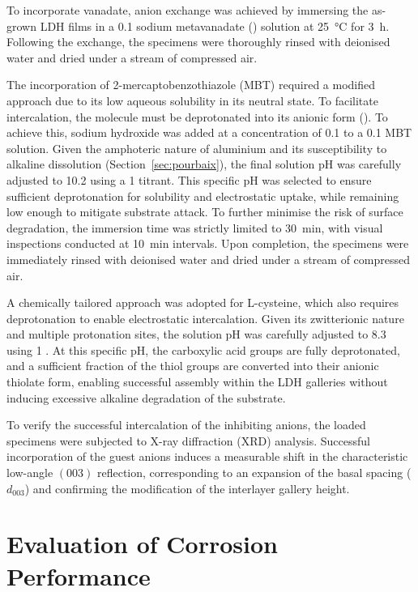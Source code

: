 \documentclass[11pt,twoside,a4paper,final]{report}
\begin{document}
To incorporate vanadate, anion exchange was achieved by immersing the as-grown LDH films in a \qty{0.1}{\molar} sodium metavanadate () solution at \qty{25}{\degreeCelsius} for \qty{3}{\hour}. Following the exchange, the specimens were thoroughly rinsed with deionised water and dried under a stream of compressed air.

The incorporation of 2-mercaptobenzothiazole (MBT) required a modified approach due to its low aqueous solubility in its neutral state. To facilitate intercalation, the molecule must be deprotonated into its anionic form (). To achieve this, sodium hydroxide was added at a concentration of \qty{0.1}{\molar} to a \qty{0.1}{\molar} MBT solution. Given the amphoteric nature of aluminium and its susceptibility to alkaline dissolution (Section~\ref{sec:pourbaix}), the final solution pH was carefully adjusted to 10.2 using a \qty{1}{\molar}  titrant. This specific pH was selected to ensure sufficient deprotonation for solubility and electrostatic uptake, while remaining low enough to mitigate substrate attack. To further minimise the risk of surface degradation, the immersion time was strictly limited to \qty{30}{\minute}, with visual inspections conducted at \qty{10}{\minute} intervals. Upon completion, the specimens were immediately rinsed with deionised water and dried under a stream of compressed air.

A chemically tailored approach was adopted for L-cysteine, which also requires deprotonation to enable electrostatic intercalation. Given its zwitterionic nature and multiple protonation sites, the solution pH was carefully adjusted to 8.3 using \qty{1}{\molar} . At this specific pH, the carboxylic acid groups are fully deprotonated, and a sufficient fraction of the thiol groups are converted into their anionic thiolate form, enabling successful assembly within the LDH galleries without inducing excessive alkaline degradation of the substrate.

To verify the successful intercalation of the inhibiting anions, the loaded specimens were subjected to X-ray diffraction (XRD) analysis. Successful incorporation of the guest anions induces a measurable shift in the characteristic low-angle $(003)$ reflection, corresponding to an expansion of the basal spacing ($d_{003}$) and confirming the modification of the interlayer gallery height.

\section{Evaluation of Corrosion Performance}
\label{sec:corrosion_evaluation}
\end{document}
